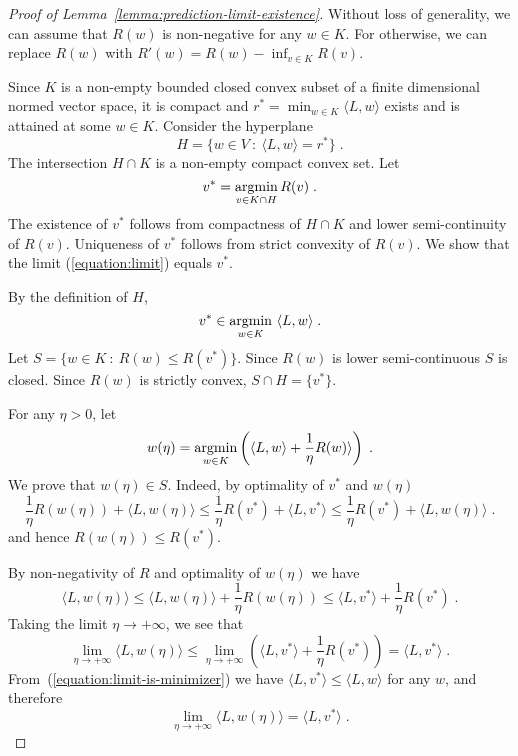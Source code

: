 \begin{proof}[Proof of Lemma~\ref{lemma:prediction-limit-existence}]
Without loss of generality, we can assume that $R(w)$ is non-negative for any
$w \in K$.  For otherwise, we can replace $R(w)$ with $R'(w) = R(w) - \inf_{v
\in K} R(v)$.

Since $K$ is a non-empty bounded closed convex subset of a finite dimensional
normed vector space, it is compact and $r^* = \min_{w \in K} \langle L, w
\rangle$ exists and is attained at some $w \in K$. Consider the hyperplane
$$
H = \{ w \in V ~:~ \langle L, w \rangle = r^* \} \; .
$$
The intersection $H \cap K$ is a non-empty compact convex set.
Let
$$
v^* = \operatorname*{argmin}_{v \in K \cap H} R(v) \; .
$$
The existence of $v^*$ follows from compactness of $H \cap K$ and lower
semi-continuity of $R(v)$.  Uniqueness of $v^*$ follows from strict convexity
of $R(v)$. We show that the limit (\ref{equation:limit}) equals $v^*$.

By the definition of $H$,
\begin{equation}
\label{equation:limit-is-minimizer}
v^* \in \operatorname*{argmin}_{w \in K} \ \langle L, w \rangle \; .
\end{equation}
Let $S = \{ w \in K ~:~ R(w) \le R(v^*) \}$. Since $R(w)$ is lower
semi-continuous $S$ is closed. Since $R(w)$ is strictly convex, $S \cap H =
\{v^*\}$.

For any $\eta > 0$, let
$$
w(\eta) = \operatorname*{argmin}_{w \in K} \left( \langle L, w \rangle + \frac{1}{\eta} R(w) \rangle \right) \; .
$$
We prove that $w(\eta) \in S$. Indeed, by optimality of $v^*$ and $w(\eta)$
$$
\frac{1}{\eta} R(w(\eta))  + \langle L, w(\eta) \rangle
\le
\frac{1}{\eta} R(v^*)  + \langle L, v^* \rangle
\le
\frac{1}{\eta} R(v^*)  + \langle L, w(\eta) \rangle \; .
$$
and hence $R(w(\eta)) \le R(v^*)$.

By non-negativity of $R$ and optimality of $w(\eta)$ we have
$$
\langle L, w(\eta) \rangle
\le \langle L, w(\eta) \rangle + \frac{1}{\eta} R(w(\eta))
\le \langle L, v^* \rangle + \frac{1}{\eta} R(v^*) \; .
$$
Taking the limit $\eta \to +\infty$, we see that
$$
\lim_{\eta \to +\infty} \langle L, w(\eta) \rangle
\le\lim_{\eta \to +\infty} \left( \langle L, v^* \rangle + \frac{1}{\eta} R(v^*) \right)
= \langle L, v^* \rangle \; .
$$
From~(\ref{equation:limit-is-minimizer}) we have
$\langle L, v^* \rangle \le \langle L, w \rangle$ for any $w$, and therefore
\begin{equation}
\label{equation:limit-equality}
\lim_{\eta \to +\infty} \langle L, w(\eta) \rangle = \langle L, v^* \rangle \; .
\end{equation}


\end{proof}
